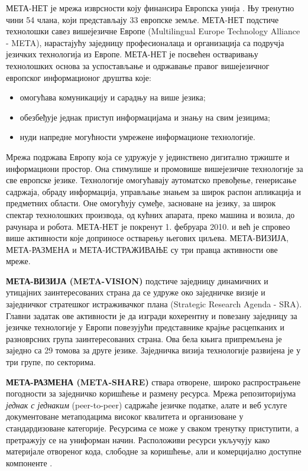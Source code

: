  \begin{multicols}{2}


МЕТА-НЕТ је мрежа изврсности коју финансира Европска унија \cite{rehm2011}. Њу тренутно чини 54 члана, који представљају 33 европске земље. МЕТА-НЕТ подстиче технолошки савез вишејезичне Европе (Multilingual Europe Technology Alliance - META), нарастајућу заједницу професионалаца и организација са подручја језичких технологија из Европе. 
МЕТА-НЕТ је посвећен остваривању технолошких основа за успостављање и одржавање правог вишејезичног европског информационог друштва које:
\begin{itemize}
\item омогућава комуникацију и сарадњу на више језика; 
\item обезбеђује једнак приступ информацијама и знању на свим језицима;
\item нуди напредне могућности умрежене информационе технологије.
\end{itemize}
Мрежа подржава Европу која се удружује у јединствено дигитално тржиште и информациони простор. Она стимулише и промовише вишејезичне технологије за све европске језике. Технологије омогућавају аутоматско превођење, генерисање садржаја, обраду информација, у\-прав\-ља\-ње знањем за широк распон апликација и предметних области. Оне омогућују сумеђе, засноване на језику, за широк спектар технолошких производа, од кућних апарата, преко машина и возила, до рачунара и робота. 
МЕТА-НЕТ је покренут 1. фебруара 2010. и већ је спровео више активности које доприносе остварењу његових циљева. МЕТА-ВИЗИЈА, МЕТА-РАЗМЕНА и МЕТА-ИСТРАЖИВАЊЕ су три правца активности ове мреже. 

\textbf{МЕТА-ВИЗИЈА (META-VISION)} подстиче заједницу динамичних и утицајних заинтересованих страна да се удруже око заједничке визије и заједничког стратешког истраживачког плана (Strategic Research Agenda - SRA). Главни задатак ове активности је да изгради кохерентну и повезану заједницу за језичке технологије у Европи повезујући представнике крајње расцепканих и разноврсних група заинтересованих страна. Ова бела књига припремљена је заједно са 29 томова за друге језике. Заједничка визија технологије развијена је у три групе, по секторима. 
   
\textbf{МЕТА-РАЗМЕНА (META-SHARE)} ствара отворене, широко распрострањене погодности за заједничко коришћење и размену ресурса. Мрежа репозиторијума \textit{једнак с једнаким} (peer-to-peer) садржаће језичке податке, алате и веб услуге документоване метаподацима високог квалитета и организоване у стандардизоване категорије. Ресурсима се може у сваком тренутку приступити, а претражују се на униформан начин. Расположиви ресурси укључују како материјале отвореног кода, слободне за коришћење, али и комерцијално доступне компоненте . 
   

\end{multicols}
